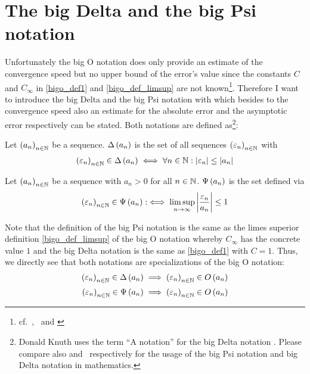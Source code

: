 \section{The big Delta and the big Psi notation}
Unfortunately the big O notation does only provide an estimate of the convergence speed but no upper bound of the error's value since the constants $C$ and $C_\infty$ in \eqref{bigo_def1} and \eqref{bigo_def_limsup} are not known\footnote{cf.~\cite[p.~444]{graham},~\cite{hurkyl_bigo} and \cite{templatetypedef_bigo}}. Therefore I want to introduce the big Delta and the big Psi notation with which besides to the convergence speed also an estimate for the absolute error and the asymptotic error respectively can be stated. Both notations are defined as\footnote{Donald Knuth uses the term ``A notation'' for the big Delta notation \cite{anotation}. Please compare also \cite{tampis_bigpsi} and~\cite{tampis_bigabs} respectively for the usage of the big Psi notation and big Delta notation in mathematics.}:

\begin{definition}
  Let $\left({a_n}\right)_{{n}\in\mathbb N}$ be a sequence. $\Delta\left( {a_n} \right)$ is the set of all sequences $\left({\varepsilon_n}\right)_{{n}\in\mathbb N}$ with
  \begin{align}
    \left({\varepsilon_n}\right)_{{n}\in\mathbb N} \in \Delta\left( {a_n} \right) \iff \forall n\in\mathbb N: \left|{\varepsilon_n}\right| \le \left|{a_n}\right|
  \end{align}
\end{definition}

\begin{definition}
  Let $\left({a_n}\right)_{{n}\in\mathbb N}$ be a sequence with $a_n > 0$ for all $n\in\mathbb N$. $\Psi\left( {a_n} \right)$ is the set defined via
  \begin{align}
    \left({\varepsilon_n}\right)_{{n}\in\mathbb N} \in \Psi\left( {a_n} \right) :\iff \limsup_{n\to\infty} \left|{\frac{\varepsilon_n}{a_n}}\right| \le 1
  \end{align}
\end{definition}

Note that the definition of the big Psi notation is the same as the limes superior definition \eqref{bigo_def_limsup} of the big O notation whereby $C_\infty$ has the concrete value $1$ and the big Delta notation is the same as \eqref{bigo_def1} with $C=1$. Thus, we directly see that both notations are specializations of the big O notation:
\begin{align}
  \seq{\epsilon_n} \in \bigabs{a_n} & \implies \seq{\epsilon_n} \in \bigo{a_n} \nl
  \seq{\epsilon_n} \in \bigpsi{a_n} & \implies \seq{\epsilon_n} \in \bigo{a_n}
\end{align}

